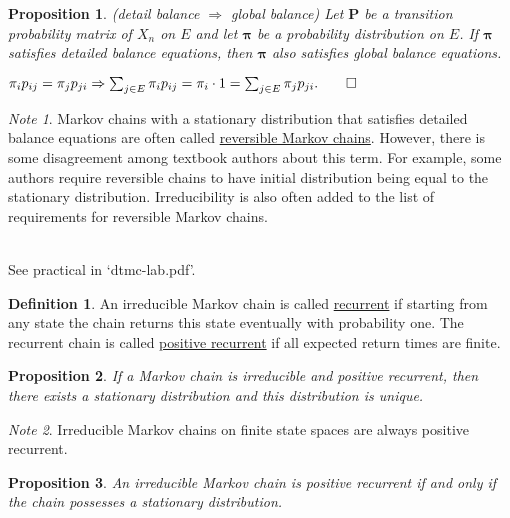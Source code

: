 \documentclass[11pt]{article}\usepackage[]{graphicx}\usepackage[]{color}
\numberwithin{algorithm}{section}
\newtheorem*{prop}{Proposition}
\theoremstyle{remark}
\newtheorem*{mynote}{Note}
\theoremstyle{definition}
\newtheorem*{define}{Definition}
\newenvironment{example}[1]{\begin{trivlist}
\item[\hskip \labelsep {\bfseries Example}: \underline{#1}]\ \\}{\end{trivlist}}
\newenvironment{Proof}{\begin{trivlist}
\item[\hskip \labelsep \textit{Proof}:]}{\end{trivlist}}
\begin{document}
\begin{prop}(detail balance $\Rightarrow$ global balance)
  Let $\mathbf{P}$ be a transition probability matrix of $X_n$ on $E$ and let $\boldsymbol{\pi}$ be a
probability distribution on $E$. If $\boldsymbol{\pi}$ satisfies detailed balance equations, then 
$\boldsymbol{\pi}$ also satisfies global balance equations.
\end{prop}

\begin{Proof}
  $\pi_i p_{ij} = \pi_j p_{ji}
  \Rightarrow \sum_{j \in E} \pi_ip_{ij} 
  = \pi_i\cdot 1 
  = \sum_{j\in E} \pi_j p_{ji}. \qed$
\end{Proof}
\begin{mynote}
  Markov chains with a stationary distribution that satisfies detailed balance equations are often 
  called \underline{reversible Markov chains}. However, there is some disagreement among textbook
  authors about this term. For example, some authors require reversible chains to have initial
  distribution being equal to the stationary distribution. Irreducibility is also often added to 
  the list of requirements for reversible Markov chains.
\end{mynote}

\begin{example}{Ehrenfest model of diffusion}
See practical in `dtmc-lab.pdf'.
\end{example}

\begin{define}
  An irreducible Markov chain is called \underline{recurrent} if starting from any state the chain 
  returns this state eventually with probability one. The recurrent chain is called 
  \underline{positive recurrent} if all expected return times are finite.
\end{define}

\begin{prop}
  If a Markov chain is irreducible and positive recurrent, then there exists a stationary distribution and 
  this distribution is unique.
\end{prop}

\begin{mynote}
  Irreducible Markov chains on finite state spaces are always positive recurrent.
\end{mynote}

\begin{prop}
  An irreducible Markov chain is positive recurrent if and only if the chain possesses a stationary distribution.
\end{prop}
\end{document}
